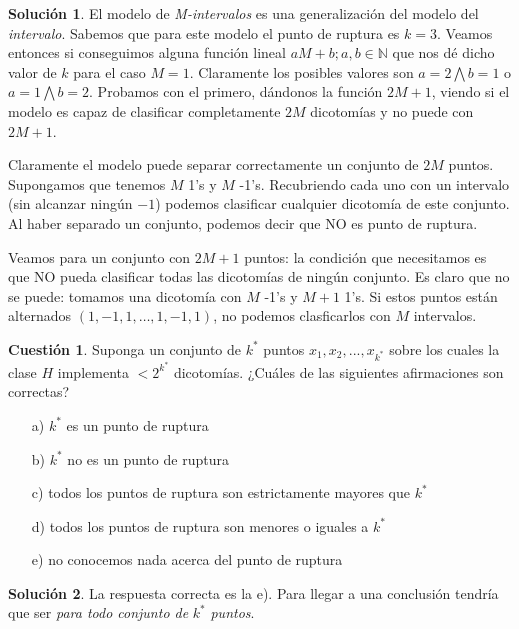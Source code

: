 \documentclass[a4paper, 11pt]{article}
\theoremstyle{definition}
\newtheorem{cuestion}{Cuestión}
\newtheorem*{solucion}{Solución}
\begin{document}
  \begin{solucion}
    El modelo de \emph{M-intervalos} es una generalización del modelo del \emph{intervalo}. Sabemos que para este modelo el punto de ruptura es $k = 3$. Veamos entonces si conseguimos alguna función lineal $aM + b; a,b \in \mathbb{N}$ que nos dé dicho valor de $k$ para el caso $M = 1$. Claramente los posibles valores son $a = 2 \bigwedge b = 1$ o $a = 1 \bigwedge b = 2$. Probamos con el primero, dándonos la función $2M+1$, viendo si el modelo es capaz de clasificar completamente $2M$ dicotomías y no puede con $2M+1$.

    Claramente el modelo puede separar correctamente un conjunto de $2M$ puntos. Supongamos que tenemos $M$ 1's y $M$ -1's. Recubriendo cada uno con un intervalo (sin alcanzar ningún $-1$) podemos clasificar cualquier dicotomía de este conjunto. Al haber separado un conjunto, podemos decir que NO es punto de ruptura.

    Veamos para un conjunto con $2M+1$ puntos: la condición que necesitamos es que NO pueda clasificar todas las dicotomías de ningún conjunto. Es claro que no se puede: tomamos una dicotomía con $M$ -1's y $M+1$ 1's. Si estos puntos están alternados $(1,-1,1,\ldots,1,-1,1)$, no podemos clasficarlos con $M$ intervalos.
  \end{solucion}

  \begin{cuestion}
  Suponga un conjunto de $k^*$ puntos $x_1,x_2,...,x_{k^*}$ sobre los cuales la clase $H$ implementa $<2^{k^*}$ dicotomías. ¿Cuáles de las siguientes afirmaciones son correctas?
  \begin{enumerate}
  \item[a)] $k^*$ es un punto de ruptura
  \item[b)] $k^*$ no es un punto de ruptura
  \item[c)] todos los puntos de ruptura son estrictamente mayores que $k^*$
  \item[d)] todos los puntos de ruptura son menores o iguales a $k^*$
  \item[e)] no conocemos nada acerca del punto de ruptura
  \end{enumerate}

  \end{cuestion}

  \begin{solucion}
    La respuesta correcta es la e). Para llegar a una conclusión tendría que ser \emph{para todo conjunto de} $k^*$ \emph{puntos}.
  \end{solucion}
\end{document}
